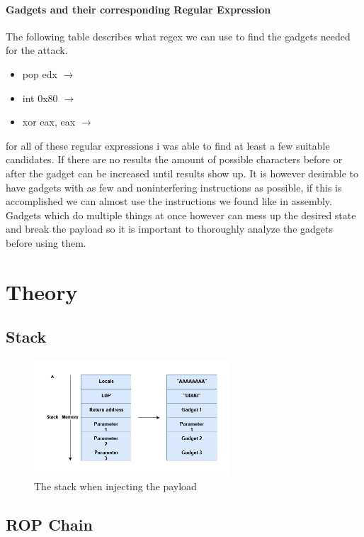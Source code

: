 \documentclass[journal=tosc,submission, notanonymous]{iacrtrans}
\begin{document}
\paragraph{Gadgets and their corresponding Regular Expression}
The following table describes what regex we can use to find the gadgets needed for the attack.
\begin{itemize}
\item pop edx  $\rightarrow$ 
\item int 0x80  $\rightarrow$  
\item xor eax, eax  $\rightarrow$  
\end{itemize}
for all of these regular expressions i was able to find at least a few suitable candidates. If there are no results the amount of possible characters before or after the gadget can be increased until results show up. It is however desirable to have gadgets with as few and noninterfering instructions as possible, if this is accomplished we can almost use the instructions we found like in assembly. Gadgets which do multiple things at once however can mess up the desired state and break the payload so it is important to thoroughly analyze the gadgets before using them.

\section{Theory}
\subsection{Stack}
\begin{figure}[h]
  \centering
  \includegraphics[width=0.65\textwidth]{stackropoffsec.png}
  \caption{The stack when injecting the payload}
  \label{fig:mesh1}
\end{figure}
\subsection{ROP Chain}
\end{document}
